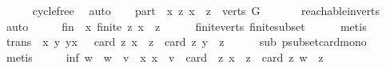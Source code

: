 \begin{isabellebody}
\ \ \ \ \isamarkupfalse%
\ cycle{\isacharunderscore}{\kern0pt}free\ \isamarkupfalse%
\ auto\isanewline
\ \ \isamarkupfalse%
\ part{\isacharcolon}{\kern0pt}\ {\isachardoublequoteopen}{\isasymforall}\ x{\isachardot}{\kern0pt}\ {\isacharbraceleft}{\kern0pt}z{\isachardot}{\kern0pt}\ x\ {\isasymrightarrow}\isactrlsup {\isacharplus}{\kern0pt}\ z{\isacharbraceright}{\kern0pt}\ {\isasymsubseteq}\ verts\ G{\isachardoublequoteclose}\ \isanewline
\ \ \ \ \isamarkupfalse%
\ reachable{}{\isacharunderscore}{\kern0pt}in{\isacharunderscore}{\kern0pt}verts\ \ \isamarkupfalse%
\ auto\isanewline
\ \ \isamarkupfalse%
\ \isamarkupfalse%
\ fin{\isacharcolon}{\kern0pt}\ {\isachardoublequoteopen}{\isasymforall}\ x{\isachardot}{\kern0pt}\ finite\ {\isacharbraceleft}{\kern0pt}z{\isachardot}{\kern0pt}\ x\ {\isasymrightarrow}\isactrlsup {\isacharplus}{\kern0pt}\ z{\isacharbraceright}{\kern0pt}{\isachardoublequoteclose}\isanewline
\ \ \ \ \isamarkupfalse%
\ finite{\isacharunderscore}{\kern0pt}verts\ finite{\isacharunderscore}{\kern0pt}subset\isanewline
\ \ \ \ \isamarkupfalse%
\ metis\ \isanewline
\ \ \isamarkupfalse%
\ \isamarkupfalse%
\ trans{\isacharcolon}{\kern0pt}\ {\isachardoublequoteopen}{\isasymforall}\ x\ y{\isachardot}{\kern0pt}\ y{\isasymrightarrow}\isactrlsup {\isacharplus}{\kern0pt}x\ {\isasymlongrightarrow}\ \ card\ {\isacharbraceleft}{\kern0pt}z{\isachardot}{\kern0pt}\ x\ {\isasymrightarrow}\isactrlsup {\isacharplus}{\kern0pt}\ z{\isacharbraceright}{\kern0pt}\ {\isacharless}{\kern0pt}\ card\ {\isacharbraceleft}{\kern0pt}z{\isachardot}{\kern0pt}\ y\ {\isasymrightarrow}\isactrlsup {\isacharplus}{\kern0pt}\ z{\isacharbraceright}{\kern0pt}{\isachardoublequoteclose}\isanewline
\ \ \ \ \isamarkupfalse%
\ sub\ psubset{\isacharunderscore}{\kern0pt}card{\isacharunderscore}{\kern0pt}mono\ \isamarkupfalse%
\ metis\isanewline
\ \ \isamarkupfalse%
\ \isamarkupfalse%
\ inf{\isacharcolon}{\kern0pt}\ {\isachardoublequoteopen}{\isasymforall}w{\isachardot}{\kern0pt}\ \ w\ {\isasymrightarrow}\isactrlsup {\isacharplus}{\kern0pt}\ v\ {\isasymlongrightarrow}\ {\isacharparenleft}{\kern0pt}{\isasymexists}x{\isachardot}{\kern0pt}\ x\ {\isasymrightarrow}\isactrlsup {\isacharplus}{\kern0pt}\ v\ {\isasymand}\ card\ \ {\isacharbraceleft}{\kern0pt}z{\isachardot}{\kern0pt}\ x\ {\isasymrightarrow}\isactrlsup {\isacharplus}{\kern0pt}\ z{\isacharbraceright}{\kern0pt}\ {\isachargreater}{\kern0pt}\ card\ {\isacharbraceleft}{\kern0pt}z{\isachardot}{\kern0pt}\ w\ {\isasymrightarrow}\isactrlsup {\isacharplus}{\kern0pt}\ z{\isacharbraceright}{\kern0pt}{\isacharparenright}{\kern0pt}{\isachardoublequoteclose}\isanewline

\end{isabellebody}
